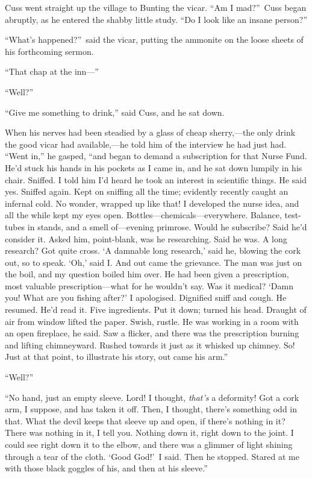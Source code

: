 Cuss went straight up the village to Bunting the vicar. “Am I mad?”\ Cuss began abruptly, as he entered the shabby little study. “Do I look like an insane person?”

“What’s happened?”\ said the vicar, putting the ammonite on the loose sheets of his forthcoming sermon.

“That chap at the inn—”

“Well?”

“Give me something to drink,” said Cuss, and he sat down.

When his nerves had been steadied by a glass of cheap sherry,—the only drink the good vicar had available,—he told him of the interview he had just had. “Went in,” he gasped, “and began to demand a subscription for that Nurse Fund. He’d stuck his hands in his pockets as I came in, and he sat down lumpily in his chair. Sniffed. I told him I’d heard he took an interest in scientific things. He said yes. Sniffed again. Kept on sniffing all the time; evidently recently caught an infernal cold. No wonder, wrapped up like that! I developed the nurse idea, and all the while kept my eyes open. Bottles—chemicals—everywhere. Balance, test-tubes in stands, and a smell of—evening primrose. Would he subscribe? Said he’d consider it. Asked him, point-blank, was he researching. Said he was. A long research? Got quite cross. ‘A damnable long research,’ said he, blowing the cork out, so to speak. ‘Oh,’ said I. And out came the grievance. The man was just on the boil, and my question boiled him over. He had been given a prescription, most valuable prescription—what for he wouldn’t say. Was it medical? ‘Damn you! What are you fishing after?’ I apologised. Dignified sniff and cough. He resumed. He’d read it. Five ingredients. Put it down; turned his head. Draught of air from window lifted the paper. Swish, rustle. He was working in a room with an open fireplace, he said. Saw a flicker, and there was the prescription burning and lifting chimneyward. Rushed towards it just as it whisked up chimney. So! Just at that point, to illustrate his story, out came his arm.”

“Well?”

“No hand, just an empty sleeve. Lord! I thought, \emph{that’s} a deformity! Got a cork arm, I suppose, and has taken it off. Then, I thought, there’s something odd in that. What the devil keeps that sleeve up and open, if there’s nothing in it? There was nothing in it, I tell you. Nothing down it, right down to the joint. I could see right down it to the elbow, and there was a glimmer of light shining through a tear of the cloth. ‘Good God!’\ I said. Then he stopped. Stared at me with those black goggles of his, and then at his sleeve.”

